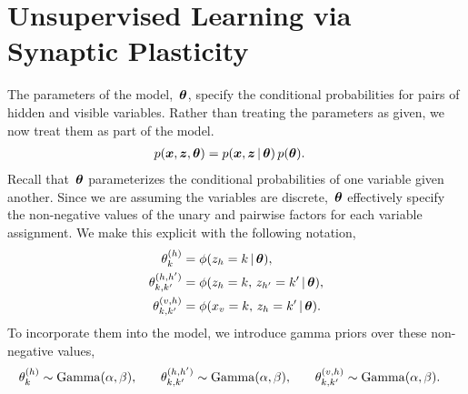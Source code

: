 \section{Unsupervised Learning via Synaptic Plasticity}
\label{sec:learning}
The parameters of the model,~$\boldsymbol{\theta}$, specify the conditional
probabilities for pairs of hidden and visible variables. Rather than
treating the parameters as given, we now treat them as part of the
model.
\begin{align}
  p(\boldsymbol{x}, \boldsymbol{z}, \boldsymbol{\theta}) &= p(\boldsymbol{x}, \boldsymbol{z} \,|\, \boldsymbol{\theta}) \, p(\boldsymbol{\theta}).
\end{align}
Recall that~$\boldsymbol{\theta}$ parameterizes the conditional probabilities
of one variable given another. Since we are assuming the variables
are discrete,~$\boldsymbol{\theta}$ effectively specify the non-negative values of the
unary and pairwise factors for each variable assignment. We
make this explicit with the following notation,
\begin{align}
  \theta_{k}^{(h)} &= \phi(z_h=k \,|\, \boldsymbol{\theta}), \\
  \theta_{k, k'}^{(h,h')} &= \phi(z_h=k, \, z_{h'}=k'\,|\, \boldsymbol{\theta}), \\
  \theta_{k, k'}^{(v,h)}  &= \phi(x_v=k, \, z_h=k' \,|\, \boldsymbol{\theta}).
\end{align}
To incorporate them into the model, we introduce gamma priors
over these non-negative values,
\begin{align}
  \theta_{k}^{(h)} &\sim \mathrm{Gamma}(\alpha, \beta), & & &
  \theta_{k,k'}^{(h,h')} &\sim \mathrm{Gamma}(\alpha, \beta), & & &
  \theta_{k,k'}^{(v,h)} &\sim \mathrm{Gamma}(\alpha, \beta).
\end{align}


